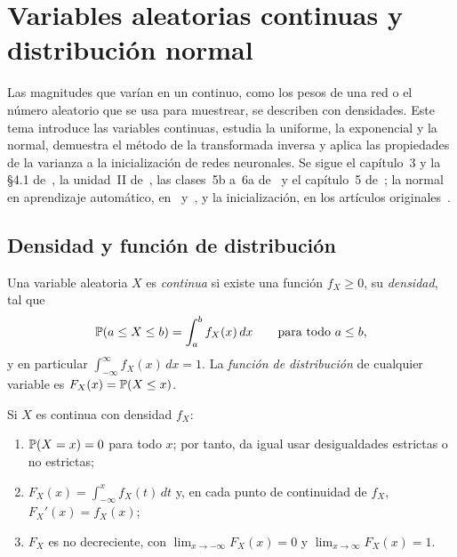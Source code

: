 \chapter{Variables aleatorias continuas y distribución normal}
\label{tema:3}

Las magnitudes que varían en un continuo, como los pesos de una red o el número aleatorio que se usa para muestrear, se describen con densidades. Este tema introduce las variables continuas, estudia la uniforme, la exponencial y la normal, demuestra el método de la transformada inversa y aplica las propiedades de la varianza a la inicialización de redes neuronales. Se sigue el capítulo~3 y la §4.1 de~\cite{bt}, la unidad~II de~\cite{mit6041}, las clases~5b a~6a de~\cite{mit1805} y el capítulo~5 de~\cite{bh}; la normal en aprendizaje automático, en~\cite[§6.5]{mml} y~\cite[§1.2.4]{bishop}, y la inicialización, en los artículos originales~\cite{glorot,he}.

\section{Densidad y función de distribución}

\begin{definicion}\label{def:continua}
Una variable aleatoria $X$ es \emph{continua} si existe una función $f_X\ge 0$, su \emph{densidad}, tal que
\[
\mathbb{P}(a\le X\le b)=\int_a^b f_X(x)\,dx\qquad\text{para todo } a\le b,
\]
y en particular $\int_{-\infty}^{\infty}f_X(x)\,dx=1$. La \emph{función de distribución} de cualquier variable es $F_X(x)=\mathbb{P}(X\le x)$.
\end{definicion}

\begin{proposicion}\label{prop:densidad}
Si $X$ es continua con densidad $f_X$:
\begin{enumerate}
  \item $\mathbb{P}(X=x)=0$ para todo $x$; por tanto, da igual usar desigualdades estrictas o no estrictas;
  \item $F_X(x)=\int_{-\infty}^{x}f_X(t)\,dt$ y, en cada punto de continuidad de $f_X$, $F_X'(x)=f_X(x)$;
  \item $F_X$ es no decreciente, con $\lim_{x\to-\infty}F_X(x)=0$ y $\lim_{x\to\infty}F_X(x)=1$.
\end{enumerate}
\end{proposicion}

